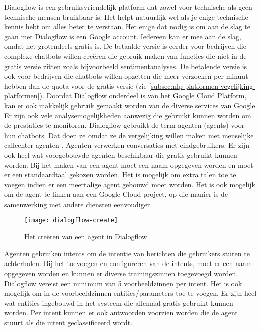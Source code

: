 Dialogflow is een gebruiksvriendelijk platform dat zowel voor technische als geen technische mensen bruikbaar is. Het helpt natuurlijk wel als je enige technische kennis hebt om alles beter te verstaan. Het enige dat nodig is om aan de slag te gaan met Dialogflow is een Google account. Iedereen kan er mee aan de slag, omdat het grotendeels gratis is. De betaalde versie is eerder voor bedrijven die complexe chatbots willen creëren die gebruik maken van functies die niet in de gratis versie zitten zoals bijvoorbeeld sentimentanalyses. De betalende versie is ook voor bedrijven die chatbots willen opzetten die meer verzoeken per minuut hebben dan de quota voor de gratis versie (zie \ref{subsec:nlp-platformen-vegelijking-platformen}). Doordat Dialogflow onderdeel is van het Google Cloud Platform, kan er ook makkelijk gebruik gemaakt worden van de diverse services van Google. Er zijn ook vele analysemogelijkheden aanwezig die gebruikt kunnen worden om de prestaties te monitoren. Dialogflow gebruikt de term agenten (agents) voor hun chatbots. Dat doen ze omdat ze de vergelijking willen maken met menselijke callcenter agenten \autocite{GoogleCloud2020}. Agenten verwerken conversaties met eindgebruikers. Er zijn ook heel wat voorgebouwde agenten beschikbaar die gratis gebruikt kunnen worden. Bij het maken van een agent moet een naam opgegeven worden en moet er een standaardtaal gekozen worden. Het is mogelijk om extra talen toe te voegen indien er een meertalige agent gebouwd moet worden. Het is ook mogelijk om de agent te linken aan een Google Cloud project, op die manier is de samenwerking met andere diensten eenvoudiger. 

\begin{figure}[H]
    \label{fig:dialogflow-create}
    \centering
    \texttt{[image: dialogflow-create]}
    \caption{Het creëren van een agent in Dialogflow}
\end{figure}

Agenten gebruiken intents om de intentie van berichten die gebruikers sturen te achterhalen. Bij het toevoegen en configureren van de intents, moet er een naam opgegeven worden en kunnen er diverse trainingszinnen toegevoegd worden. Dialogflow vereist een minimum van 5 voorbeeldzinnen per intent. Het is ook mogelijk om in de voorbeeldzinnen entities/parameters toe te voegen. Er zijn heel wat entities ingebouwd in het systeem die allemaal gratis gebruikt kunnen worden. Per intent kunnen er ook antwoorden voorzien worden die de agent stuurt als die intent geclassificeerd wordt.


